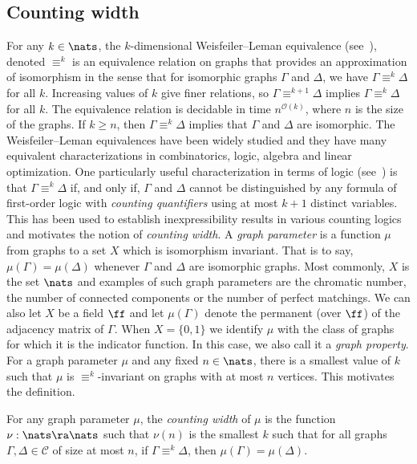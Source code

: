 \documentclass{toc}
\begin{document}
\subsection{Counting width}
For any $k \in \nats$, the $k$-dimensional Weisfeiler--Leman equivalence
(see~\cite{CFI92}), denoted $\equiv^k$ is an equivalence relation on graphs that
provides an approximation
%
of isomorphism in the sense that for isomorphic
graphs $\Gamma$ and $\Delta$, we have $\Gamma \equiv^k \Delta$ for all $k$. Increasing values of $k$
give finer relations, so $\Gamma \equiv^{k+1} \Delta$ implies $\Gamma \equiv^k \Delta$ for all $k$.
The equivalence relation is decidable in time $n^{\mathcal{O}(k)}$, where $n$ is
the size of the graphs. If $k \geq n$, then $\Gamma \equiv^k \Delta$ implies that $\Gamma$ and
$\Delta$ are isomorphic. The Weisfeiler--Leman equivalences have been widely studied
and they have many equivalent characterizations in combinatorics, logic, algebra
and linear optimization.   One particularly useful characterization in
terms of logic (see~\cite{CFI92}) is that $\Gamma \equiv^k \Delta$ if,
and only if, $\Gamma$ and $\Delta$ cannot be distinguished by any
formula of first-order logic with \emph{counting quantifiers} using at most $k+1$ distinct variables.  This has been used to  establish
inexpressibility results in various counting logics and motivates the notion of
\emph{counting width}.
A \emph{graph parameter} is a function $\mu$ from graphs to a set $X$ which is
isomorphism invariant.  That is to say, $\mu(\Gamma) = \mu(\Delta)$ whenever $\Gamma$ and $\Delta$ are isomorphic graphs.  Most commonly, $X$ is the set $\nats$ and examples of such graph parameters are the chromatic number, the number of
connected components or the number of perfect matchings.  We can also
let $X$ be a field $\ff$ and let $\mu(\Gamma)$ denote the permanent
(over $\ff$) of the adjacency matrix of $\Gamma$.  When $X = \{0,1\}$
we identify $\mu$ with the class of graphs for which it is the
indicator function.  In this case, we also call it a \emph{graph property}.
For a graph parameter
$\mu$ and any fixed $n \in \nats$, there is a smallest value of $k$ such that
$\mu$ is $\equiv^k$-invariant on graphs with at most $n$ vertices. This motivates the definition.
\begin{definition}\label{def:counting-width}
  For any graph parameter $\mu$, the \emph{counting width} of $\mu$ is the
  function $\nu : \nats \ra \nats$ such that $\nu(n)$
  is the smallest $k$ such that for all graphs $\Gamma, \Delta \in \mathcal{C}$ of size
  at most $n$, if $\Gamma \equiv^{k} \Delta$, then $\mu(\Gamma) = \mu(\Delta)$.
\end{definition}
\end{document}
